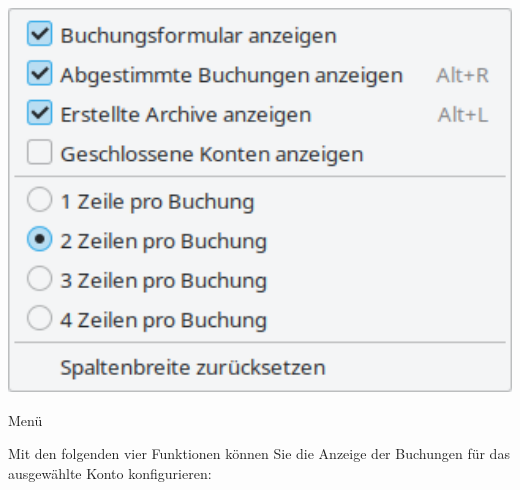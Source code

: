 \hspace{10pt}	
\begin{minipage}{.3\linewidth}
	\centering						%
	\includegraphics[width=1\textwidth]{image/screenshot/home_menubar_view}
	\vspace{-10pt}					%
	\captionsetup{
	type=figure,%
	name=Abb.,%
	labelsep=newline}			%
	\caption{Menü }		%
	\label{home_menubar_view}
\end{minipage}
\vspace{2mm}
\begin{addmargin*}[19pt]{0cm} 	%
Mit den folgenden vier Funktionen können Sie die Anzeige der Buchungen für das ausgewählte Konto konfigurieren:
\end{addmargin*}
\vspace{-2mm}
